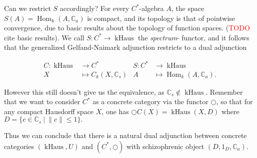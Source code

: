 \documentclass[12pt,a4paper]{article}
\DeclareMathOperator{\Hom}{Hom}
\DeclareMathOperator{\kSp}{kSp}
\DeclareMathOperator{\kHaus}{kHaus}
\begin{document}
 Can we restrict $S$ accordingly? For every $C^*$-algebra $A$, the space $S(A) = \Hom_k(A, \mathbb{C}_a)$ is compact, and its topology is that of pointwise convergence, due to basic results about the topology of function spaces. (\textcolor{red}{TODO} cite basic results). We call $S: C^* \to \kHaus$ the \emph{spectrum}- functor, and it follows that the generalized Gelfand-Naimark adjunction restricts to a dual adjunction
 
 \begin{align*}
	C: \kHaus & \to C^* &  S: C^* & \to \kHaus\\
	X &\mapsto C_k(X, \mathbb{C}_s) & A &\mapsto \Hom_k(A, \mathbb{C}_a).
\end{align*}
 
 However this still doesn't give us the equivalence, as $\mathbb{C}_s \notin \kHaus$. Remember that we want to consider $C^*$ as a concrete category via the functor $\bigcirc$, so that for any compact Hausdorff space $X$, one has $\bigcirc C(X) = \kHaus(X, D)$ where $D = \{ c \in \mathbb{C}_s \ \lvert \ \lVert c \lVert \leq 1 \}. $
 
 Thus we can conclude that there is a natural dual adjunction between concrete categories $(\kHaus, U)$ and $(C^*, \bigcirc)$ with schizophrenic object $(D, 1_D, \mathbb{C}_a)$. 
 
 
\end{document}
